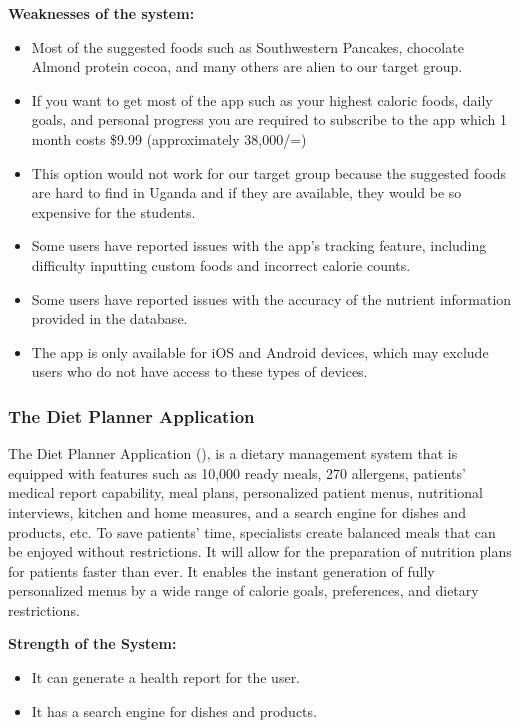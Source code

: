 \documentclass{article}
\begin{document}
\textbf{Weaknesses of the system:}
\begin{itemize}
\item Most of the suggested foods such as Southwestern Pancakes, chocolate Almond protein cocoa, and many others are alien to our target group.
\item If you want to get most of the app such as your highest caloric foods, daily goals, and personal progress you are required to subscribe to the app which 1 month costs \$9.99 (approximately 38,000/=)
\item This option would not work for our target group because the suggested foods are hard to find in Uganda and if they are available, they would be so expensive for the students.

\item Some users have reported issues with the app's tracking feature, including difficulty inputting custom foods and incorrect calorie counts.
\item Some users have reported issues with the accuracy of the nutrient information provided in the database.
\item The app is only available for iOS and Android devices, which may exclude users who do not have access to these types of devices.

\end{itemize}

\subsubsection{The Diet Planner Application}

The Diet Planner Application (\cite{dietplannerapp}), is a dietary management system that is equipped with features such as 10,000 ready meals, 270 allergens, patients' medical report capability, meal plans, personalized patient menus, nutritional interviews, kitchen and home measures, and a search engine for dishes and products, etc. To save patients' time, specialists create balanced meals that can be enjoyed without restrictions. It will allow for the preparation of nutrition plans for patients faster than ever. It enables the instant generation of fully personalized menus by a wide range of calorie goals, preferences, and dietary restrictions.

\textbf{Strength of the System:}
\begin{itemize}
\item It can generate a health report for the user.
\item It has a search engine for dishes and products.
\end{itemize}
\end{document}
